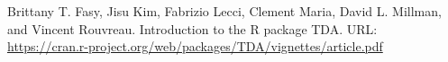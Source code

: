 \begin{thebibliography}{99}

	Brittany T. Fasy, Jisu Kim, Fabrizio Lecci, Clement
	Maria, David L. Millman, and Vincent Rouvreau. Introduction to the R package TDA. URL: \url{https://cran.r-project.org/web/packages/TDA/vignettes/article.pdf}
	
\end{thebibliography}